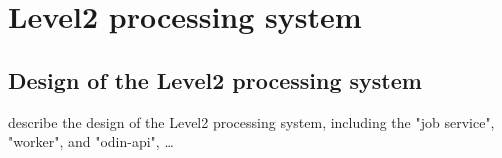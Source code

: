 \chapter{Level2 processing system}

\section{Design of the Level2 processing system}

describe the design of the Level2 processing system,
including the "job service", "worker", and "odin-api",
\dots{}\

